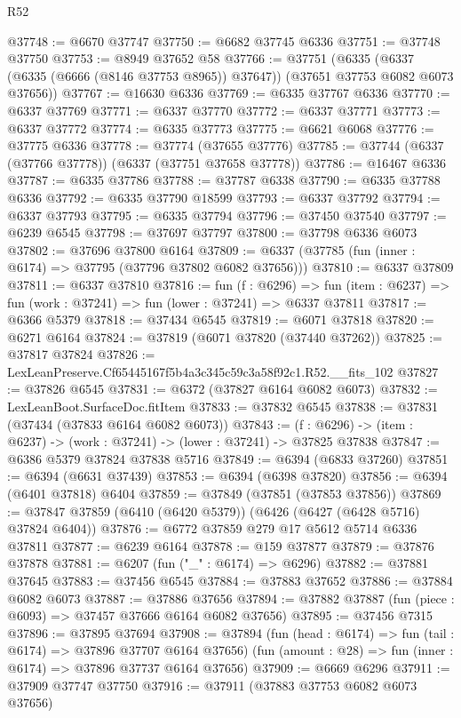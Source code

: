 \begin{lexlean}{R52}
\begin{coremodule}
@37748 := @6670 @37747
@37750 := @6682 @37745 @6336
@37751 := @37748 @37750
@37753 := @8949 @37652 @58
@37766 := @37751
    (@6335 (@6337 (@6335 (@6666 (@8146 @37753 @8965)) @37647)) (@37651 @37753 @6082 @6073 @37656))
@37767 := @16630 @6336
@37769 := @6335 @37767 @6336
@37770 := @6337 @37769
@37771 := @6337 @37770
@37772 := @6337 @37771
@37773 := @6337 @37772
@37774 := @6335 @37773
@37775 := @6621 @6068
@37776 := @37775 @6336
@37778 := @37774 (@37655 @37776)
@37785 := @37744 (@6337 (@37766 @37778)) (@6337 (@37751 @37658 @37778))
@37786 := @16467 @6336
@37787 := @6335 @37786
@37788 := @37787 @6338
@37790 := @6335 @37788 @6336
@37792 := @6335 @37790 @18599
@37793 := @6337 @37792
@37794 := @6337 @37793
@37795 := @6335 @37794
@37796 := @37450 @37540
@37797 := @6239 @6545
@37798 := @37697 @37797
@37800 := @37798 @6336 @6073
@37802 := @37696 @37800 @6164
@37809 := @6337 (@37785 (fun (inner : @6174) => @37795 (@37796 @37802 @6082 @37656)))
@37810 := @6337 @37809
@37811 := @6337 @37810
@37816 := fun (f : @6296) =>
  fun (item : @6237) => fun (work : @37241) => fun (lower : @37241) => @6337 @37811
@37817 := @6366 @5379
@37818 := @37434 @6545
@37819 := @6071 @37818
@37820 := @6271 @6164
@37824 := @37819 (@6071 @37820 (@37440 @37262))
@37825 := @37817 @37824
@37826 := LexLeanPreserve.Cf65445167f5b4a3c345c59c3a58f92c1.R52.__fits_102
@37827 := @37826 @6545
@37831 := @6372 (@37827 @6164 @6082 @6073)
@37832 := LexLeanBoot.SurfaceDoc.fitItem
@37833 := @37832 @6545
@37838 := @37831 (@37434 (@37833 @6164 @6082 @6073))
@37843 := (f : @6296) -> (item : @6237) -> (work : @37241) -> (lower : @37241) -> @37825 @37838
@37847 := @6386 @5379 @37824 @37838 @5716
@37849 := @6394 (@6833 @37260)
@37851 := @6394 (@6631 @37439)
@37853 := @6394 (@6398 @37820)
@37856 := @6394 (@6401 @37818) @6404
@37859 := @37849 (@37851 (@37853 @37856))
@37869 := @37847 @37859 (@6410 (@6420 @5379)) (@6426 (@6427 (@6428 @5716) @37824 @6404))
@37876 := @6772 @37859 @279 @17 @5612 @5714 @6336 @37811
@37877 := @6239 @6164
@37878 := @159 @37877
@37879 := @37876 @37878
@37881 := @6207 (fun ("_" : @6174) => @6296)
@37882 := @37881 @37645
@37883 := @37456 @6545
@37884 := @37883 @37652
@37886 := @37884 @6082 @6073
@37887 := @37886 @37656
@37894 := @37882 @37887 (fun (piece : @6093) => @37457 @37666 @6164 @6082 @37656)
@37895 := @37456 @7315
@37896 := @37895 @37694
@37908 := @37894
    (fun (head : @6174) => fun (tail : @6174) => @37896 @37707 @6164 @37656)
    (fun (amount : @28) => fun (inner : @6174) => @37896 @37737 @6164 @37656)
@37909 := @6669 @6296
@37911 := @37909 @37747 @37750
@37916 := @37911 (@37883 @37753 @6082 @6073 @37656)

\end{coremodule}
\end{lexlean}
